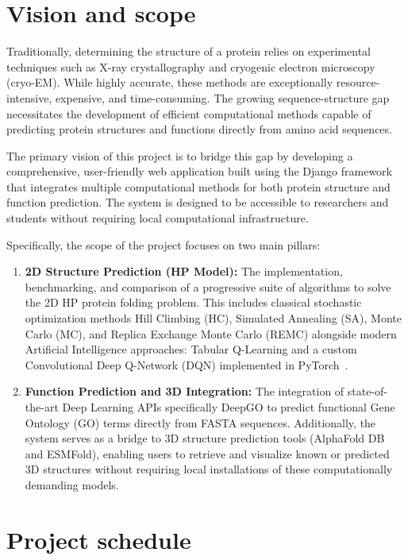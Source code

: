 \section{Vision and scope}
\label{intro:sec_vision}

Traditionally, determining the structure of a protein relies on experimental techniques such as X-ray crystallography and cryogenic electron microscopy (cryo-EM). While highly accurate, these methods are exceptionally resource-intensive, expensive, and time-consuming. The growing sequence-structure gap necessitates the development of efficient computational methods capable of predicting protein structures and functions directly from amino acid sequences.

The primary vision of this project is to bridge this gap by developing a comprehensive, user-friendly web application built using the Django framework~\cite{django2024} that integrates multiple computational methods for both protein structure and function prediction. The system is designed to be accessible to researchers and students without requiring local computational infrastructure.

Specifically, the scope of the project focuses on two main pillars:

\begin{enumerate}
    \item \textbf{2D Structure Prediction (HP Model):} The implementation, benchmarking, and comparison of a progressive suite of algorithms to solve the 2D HP protein folding problem. This includes classical stochastic optimization methods Hill Climbing (HC), Simulated Annealing (SA), Monte Carlo (MC), and Replica Exchange Monte Carlo (REMC) alongside modern Artificial Intelligence approaches: Tabular Q-Learning and a custom Convolutional Deep Q-Network (DQN) implemented in PyTorch~\cite{paszke2019pytorch}.

    \item \textbf{Function Prediction and 3D Integration:} The integration of state-of-the-art Deep Learning APIs specifically DeepGO to predict functional Gene Ontology (GO) terms directly from FASTA sequences. Additionally, the system serves as a bridge to 3D structure prediction tools (AlphaFold DB~\cite{varadi2022alphafold} and ESMFold), enabling users to retrieve and visualize known or predicted 3D structures without requiring local installations of these computationally demanding models.
\end{enumerate}

\section{Project schedule}
\label{intro:sec_schedule}

